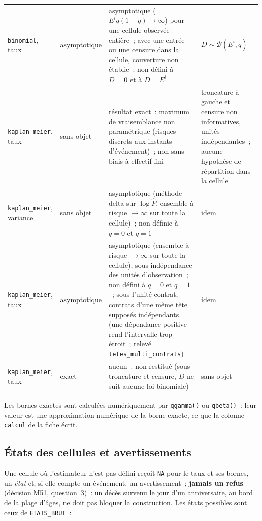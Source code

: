 \documentclass[a4paper,11pt]{article}
\newcommand{\code}[1]{\texttt{\small #1}}
\begin{document}
{\begin{longtable}{@{}p{2.6cm}p{2.3cm}p{6.0cm}p{3.7cm}@{}}
\code{binomial}, taux & asymptotique & asymptotique ($E^i q(1-q) \to \infty$) pour une cellule observée entière~; avec une entrée ou une censure dans la cellule, couverture non établie~; non défini à $D = 0$ et à $D = E^i$ & $D \sim \mathcal{B}(E^i, q)$ \\
\code{kaplan\_meier}, taux & sans objet & résultat exact~: maximum de vraisemblance non paramétrique (risques discrets aux instants d'événement)~; non sans biais à effectif fini & troncature à gauche et censure non informatives, unités indépendantes~; aucune hypothèse de répartition dans la cellule \\
\code{kaplan\_meier}, variance & sans objet & asymptotique (méthode delta sur $\log \hat P$, ensemble à risque $\to \infty$ sur toute la cellule)~; non définie à $q = 0$ et $q = 1$ & idem \\
\code{kaplan\_meier}, taux & asymptotique & asymptotique (ensemble à risque $\to \infty$ sur toute la cellule), sous indépendance des unités d'observation~; non défini à $q = 0$ et $q = 1$~; sous l'unité contrat, contrats d'une même tête supposés indépendants (une dépendance positive rend l'intervalle trop étroit~; relevé \code{tetes\_multi\_contrats}) & idem \\
\code{kaplan\_meier}, taux & exact & aucun~: non restitué (sous troncature et censure, $D$ ne suit aucune loi binomiale) & sans objet \\
\end{longtable}
}

\noindent
Les bornes exactes sont calculées numériquement par \code{qgamma()} ou
\code{qbeta()}~: leur valeur est une approximation numérique de la borne
exacte, ce que la colonne \code{calcul} de la fiche écrit.

\subsection{États des cellules et avertissements}
\label{sec:brut-etats}

Une cellule où l'estimateur n'est pas défini reçoit \code{NA} pour le taux et
ses bornes, un \emph{état} et, si elle compte un événement, un
avertissement~; \textbf{jamais un refus} (décision M51, question~3)~: un
décès survenu le jour d'un anniversaire, au bord de la plage d'âges, ne doit
pas bloquer la construction. Les états possibles sont ceux de
\code{ETATS\_BRUT}~:
\end{document}
